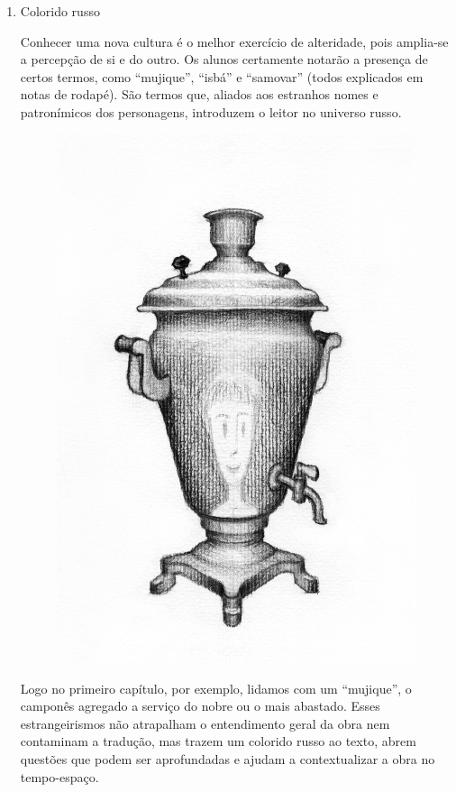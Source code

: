 \documentclass{article}
\begin{document}
\begin{enumerate}
\item
Colorido russo

Conhecer uma nova cultura é o melhor exercício de alteridade, pois
amplia-se a percepção de si e do outro. Os alunos certamente notarão a
presença de certos termos, como ``mujique'', ``isbá'' e ``samovar''
(todos explicados em notas de rodapé). São termos que, aliados aos
estranhos nomes e patronímicos dos personagens, introduzem o leitor no
universo russo.

\begin{figure}[ht!]
\includegraphics[width=\textwidth]{./images/PNLD0049-04.png}
\end{figure}

Logo no primeiro capítulo, por exemplo, lidamos com um ``mujique'', o
camponês agregado a serviço do nobre ou o mais abastado. Esses
estrangeirismos não atrapalham o entendimento geral da obra nem
contaminam a tradução, mas trazem um colorido russo ao texto, abrem
questões que podem ser aprofundadas e ajudam a contextualizar a obra no
tempo-espaço.


\end{enumerate}
\end{document}
